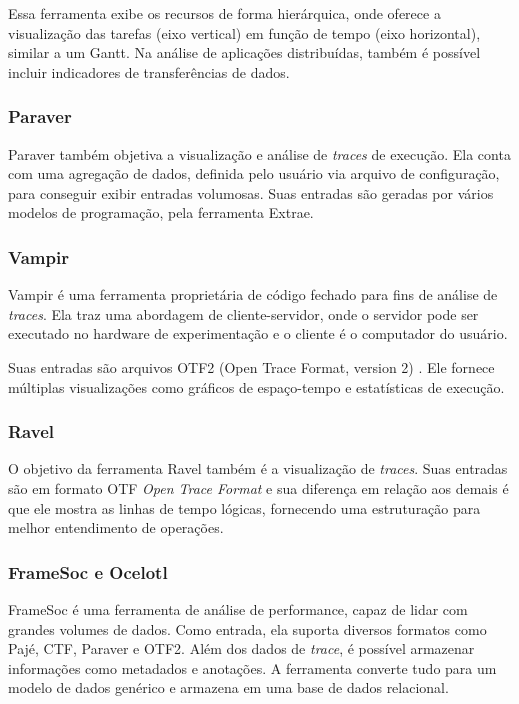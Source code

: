 Essa ferramenta exibe os recursos de forma hierárquica, onde oferece a visualização das tarefas (eixo vertical) em função de tempo (eixo horizontal), similar a um Gantt. Na análise de aplicações distribuídas, também é possível incluir indicadores de transferências de dados.

\subsubsection*{Paraver}
Paraver \cite{ref:paraver} também objetiva a visualização e análise de \emph{traces} de execução. Ela conta com uma agregação de dados, definida pelo
usuário via arquivo de configuração, para conseguir exibir entradas volumosas. Suas entradas são geradas por vários modelos de programação, pela ferramenta Extrae.

\subsubsection*{Vampir}
Vampir \cite{ref:vampir} é uma ferramenta proprietária de código fechado para fins de análise de \emph{traces}. Ela traz uma abordagem de cliente-servidor, onde o servidor pode ser executado no hardware de experimentação e o cliente é o computador do usuário.

Suas entradas são arquivos OTF2 (Open Trace Format, version 2) \cite{ref:otf2}. Ele fornece múltiplas visualizações como gráficos de espaço-tempo e estatísticas de execução.

\subsubsection*{Ravel}
O objetivo da ferramenta Ravel \cite{ref:ravel} também é a visualização de \emph{traces}. Suas entradas são em formato OTF \emph{Open Trace Format} e sua diferença em relação aos demais é que ele mostra as linhas de tempo lógicas, fornecendo uma estruturação para melhor entendimento de operações.

\subsubsection*{FrameSoc e Ocelotl}

FrameSoc \cite{ref:framesoc} é uma ferramenta de análise de performance, capaz de lidar com grandes volumes de dados. Como entrada, ela suporta diversos
formatos como Pajé, CTF, Paraver e OTF2. Além dos dados de \emph{trace}, é possível armazenar informações como metadados e anotações. A ferramenta converte tudo para um modelo de dados genérico e armazena em uma base de dados relacional.

